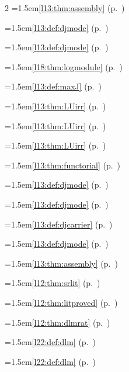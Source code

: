 \begin{multicols}{2}
\hangindent=1.5em\quad \ref{l13:thm:assembly} (p.~\pageref{l13:thm:assembly})\par
\hangindent=1.5em\quad \ref{l13:def:djmode} (p.~\pageref{l13:def:djmode})\par
\hangindent=1.5em\quad \ref{l13:def:djmode} (p.~\pageref{l13:def:djmode})\par
\hangindent=1.5em\quad \ref{l18:thm:logmodule} (p.~\pageref{l18:thm:logmodule})\par
\hangindent=1.5em\quad \ref{l13:def:maxJ} (p.~\pageref{l13:def:maxJ})\par
\hangindent=1.5em\quad \ref{l13:thm:LUirr} (p.~\pageref{l13:thm:LUirr})\par
\hangindent=1.5em\quad \ref{l13:thm:LUirr} (p.~\pageref{l13:thm:LUirr})\par
\hangindent=1.5em\quad \ref{l13:thm:LUirr} (p.~\pageref{l13:thm:LUirr})\par
\hangindent=1.5em\quad \ref{l13:thm:functorial} (p.~\pageref{l13:thm:functorial})\par
\hangindent=1.5em\quad \ref{l13:def:djmode} (p.~\pageref{l13:def:djmode})\par
\hangindent=1.5em\quad \ref{l13:def:djmode} (p.~\pageref{l13:def:djmode})\par
\hangindent=1.5em\quad \ref{l13:def:djcarrier} (p.~\pageref{l13:def:djcarrier})\par
\hangindent=1.5em\quad \ref{l13:def:djmode} (p.~\pageref{l13:def:djmode})\par
\hangindent=1.5em\quad \ref{l13:thm:assembly} (p.~\pageref{l13:thm:assembly})\par
\hangindent=1.5em\quad \ref{l12:thm:srlit} (p.~\pageref{l12:thm:srlit})\par
\hangindent=1.5em\quad \ref{l12:thm:litproved} (p.~\pageref{l12:thm:litproved})\par
\hangindent=1.5em\quad \ref{l12:thm:dlmrat} (p.~\pageref{l12:thm:dlmrat})\par
\hangindent=1.5em\quad \ref{l22:def:dlm} (p.~\pageref{l22:def:dlm})\par
\hangindent=1.5em\quad \ref{l22:def:dlm} (p.~\pageref{l22:def:dlm})\par

\end{multicols}
